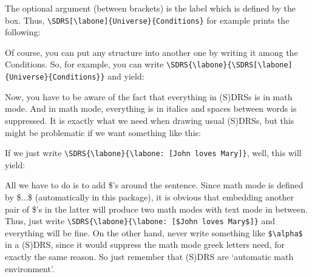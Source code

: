 \documentclass[a4paper]{article}
\begin{document}
The optional argument (between brackets) is the label which is defined by the box. Thus, \newline \verb+\SDRS[\labone]{Universe}{Conditions}+ for example prints the following:
\begin{center}
\end{center}
Of course, you can put any structure into another one by writing it among the Conditions. So, for example, you can write \verb+\SDRS{\labone}{\SDRS[\labone]+\verb+{Universe}{Conditions}}+ and yield:
\begin{center}
\end{center}

Now, you have to be aware of the fact that everything in (S)DRSs is in math mode. And in math mode, everything is in italics and spaces between words is suppressed. It is exactly what we need when drawing usual (S)DRSs, but this might be problematic if we want something like this:

\begin{center}
\end{center}
If we just write \verb+\SDRS{\labone}{\labone: [John loves Mary]}+, well, this will yield:

\begin{center}
\end{center}
All we have to do is to add \$'s around the sentence. Since math mode is defined by \$...\$ (automatically in this package), it is obvious that embedding another pair of \$'s in the latter will produce two math modes with text mode in between. Thus, just write \verb+\SDRS{\labone}{\labone: [$John loves Mary$]}+ and everything will be fine. On the other hand, never write something like \verb+$\alpha$+ in a (S)DRS, since it would suppress the math mode greek letters need, for exactly the same reason. So just remember that (S)DRS are `automatic math environment'.
\end{document}
